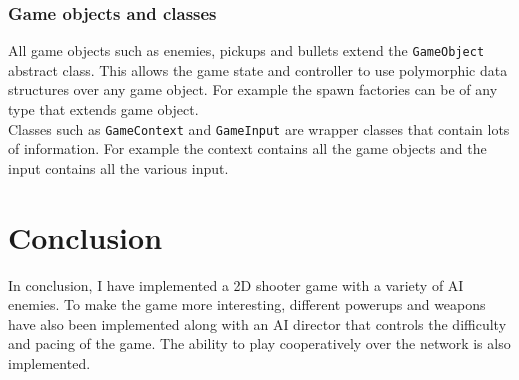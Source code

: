 \documentclass{article}
\newcommand{\n}[0]{\\[\baselineskip]}
\begin{document}
\subsubsection{Game objects and classes}
All game objects such as enemies, pickups and bullets extend the \texttt{GameObject} abstract class. This allows the game state and controller to use polymorphic data structures over any game object. For example the spawn factories can be of any type that extends game object. 
\n
Classes such as \texttt{GameContext} and \texttt{GameInput} are wrapper classes that contain lots of information. For example the context contains all the game objects and the input contains all the various input. 
\section{Conclusion}
In conclusion, I have implemented a 2D shooter game with a variety of AI enemies. To make the game more interesting, different powerups and weapons have also been implemented along with an AI director that controls the difficulty and pacing of the game. The ability to play cooperatively over the network is also implemented.

\printbibliography
\end{document}
